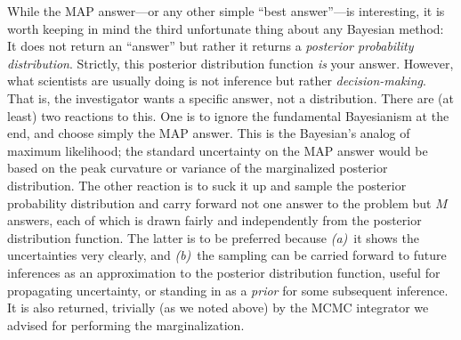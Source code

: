 \documentclass[12pt,twoside,pdftex]{article}
\begin{document}
While the MAP answer---or any other simple ``best answer''---is
interesting, it is worth keeping in mind the third unfortunate thing
about any Bayesian method: It does not return an ``answer'' but rather
it returns a \emph{posterior probability distribution}.  Strictly,
this posterior distribution function \emph{is} your answer.  However,
what scientists are usually doing is not inference but rather
\emph{decision-making}.  That is, the investigator wants a specific
answer, not a distribution.  There are (at least) two reactions to
this.  One is to ignore the fundamental Bayesianism at the end, and
choose simply the MAP answer.  This is the Bayesian's analog of
maximum likelihood; the standard uncertainty on the MAP answer would
be based on the peak curvature or variance of the marginalized
posterior distribution.  The other reaction is to suck it up and
sample the posterior probability distribution and carry forward not
one answer to the problem but $M$ answers, each of which is drawn
fairly and independently from the posterior distribution function.
The latter is to be preferred because \textsl{(a)}~it shows the
uncertainties very clearly, and \textsl{(b)}~the sampling can be
carried forward to future inferences as an approximation to the
posterior distribution function, useful for propagating uncertainty,
or standing in as a \emph{prior} for some subsequent
inference. It is also
returned, trivially (as we noted above) by the MCMC integrator we
advised for performing the marginalization.
\end{document}
